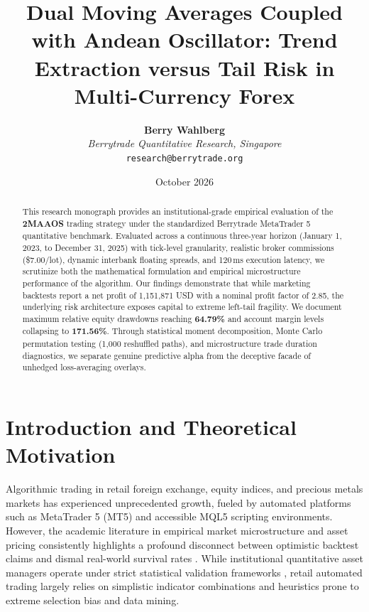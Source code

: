 \documentclass[11pt,a4paper]{article}
\title{\textbf{Dual Moving Averages Coupled with Andean Oscillator: Trend Extraction versus Tail Risk in Multi-Currency Forex}}
\author{
    \textbf{Berry Wahlberg} \\
    \textit{Berrytrade Quantitative Research, Singapore} \\
    \texttt{research@berrytrade.org}
}
\date{October 2026}
\begin{document}
\maketitle

\begin{abstract}
This research monograph provides an institutional-grade empirical evaluation of the \textbf{2MAAOS} trading strategy under the standardized Berrytrade MetaTrader 5 quantitative benchmark. Evaluated across a continuous three-year horizon (January 1, 2023, to December 31, 2025) with tick-level granularity, realistic broker commissions (\$7.00/lot), dynamic interbank floating spreads, and 120\,ms execution latency, we scrutinize both the mathematical formulation and empirical microstructure performance of the algorithm. Our findings demonstrate that while marketing backtests report a net profit of 1,151,871 USD with a nominal profit factor of 2.85, the underlying risk architecture exposes capital to extreme left-tail fragility. We document maximum relative equity drawdowns reaching \textbf{64.79\%} and account margin levels collapsing to \textbf{171.56\%}. Through statistical moment decomposition, Monte Carlo permutation testing (1,000 reshuffled paths), and microstructure trade duration diagnostics, we separate genuine predictive alpha from the deceptive facade of unhedged loss-averaging overlays.
\end{abstract}

\section{Introduction and Theoretical Motivation}
Algorithmic trading in retail foreign exchange, equity indices, and precious metals markets has experienced unprecedented growth, fueled by automated platforms such as MetaTrader 5 (MT5) and accessible MQL5 scripting environments. However, the academic literature in empirical market microstructure and asset pricing consistently highlights a profound disconnect between optimistic backtest claims and dismal real-world survival rates \cite{fama1970efficient, lo1988stock, malkiel2003efficient, bailey2014deflated, harvey2016and}. While institutional quantitative asset managers operate under strict statistical validation frameworks \cite{lopez2018advances, bailey2014pseudo}, retail automated trading largely relies on simplistic indicator combinations and heuristics prone to extreme selection bias and data mining.
\end{document}
